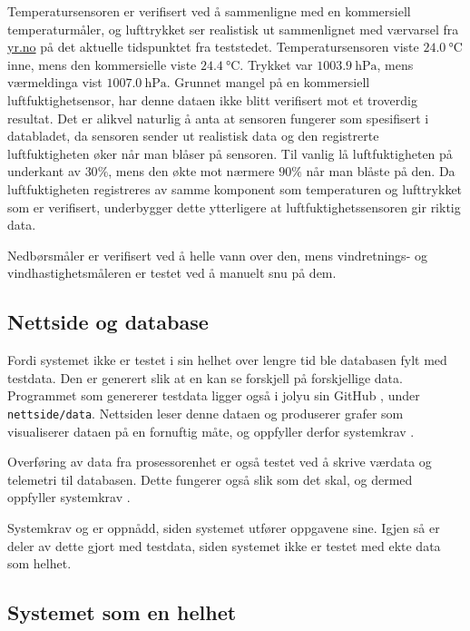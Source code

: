 Temperatursensoren er verifisert ved å sammenligne med en kommersiell temperaturmåler, og lufttrykket ser realistisk ut sammenlignet med værvarsel fra \url{yr.no} på det aktuelle tidspunktet fra teststedet. Temperatursensoren viste $\SI{24.0}{\celsius}$ inne, mens den kommersielle viste $\SI{24.4}{\celsius}$. Trykket var $\SI{1003,9}{\hecto\pascal}$, mens værmeldinga vist $\SI{1007,0}{\hecto\pascal}$.
Grunnet mangel på en kommersiell luftfuktighetsensor, har denne dataen ikke blitt verifisert mot et troverdig resultat.
Det er alikvel naturlig å anta at sensoren fungerer som spesifisert i databladet\cite{bme280}, da sensoren sender ut realistisk data og den registrerte luftfuktigheten øker når man blåser på sensoren. Til vanlig lå luftfuktigheten på underkant av $30 \%$, mens den økte mot nærmere $90 \%$ når man blåste på den.
Da luftfuktigheten registreres av samme komponent som temperaturen og lufttrykket som er verifisert, underbygger dette ytterligere at luftfuktighetssensoren gir riktig data.

Nedbørsmåler er verifisert ved å helle vann over den, mens vindretnings- og vindhastighetsmåleren er testet ved å manuelt snu på dem.


\subsection{Nettside og database}\label{sec:verifikasjon:nettside}

Fordi systemet ikke er testet i sin helhet over lengre tid ble databasen fylt med testdata. 
Den er generert slik at en kan se forskjell på forskjellige data. 
Programmet som genererer testdata ligger også i jolyu sin GitHub \cite{GitHub}, under \texttt{nettside/data}. 
Nettsiden leser denne dataen og produserer grafer som visualiserer dataen på en fornuftig måte, og oppfyller derfor systemkrav . 

Overføring av data fra prosessorenhet er også testet ved å skrive værdata og telemetri til databasen. 
Dette fungerer også slik som det skal, og dermed oppfyller systemkrav .

Systemkrav  og  er oppnådd, siden systemet utfører oppgavene sine. 
Igjen så er deler av dette gjort med testdata, siden systemet ikke er testet med ekte data som helhet.



\subsection{Systemet som en helhet}\label{sec:verifikasjon:kowona}

